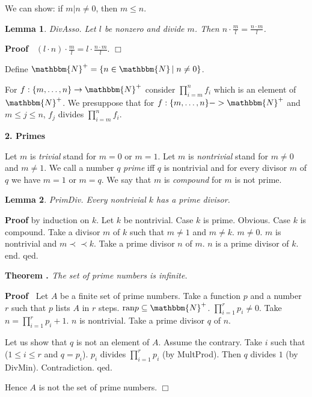 \documentclass{letter}
\newcommand{\precprec}{\prec\!\!\!\prec}
\newcommand{\subsection}[1]{\medskip\bigskip

\noindent\textbf{\Large #1}}
\newcommand{\tmem}[1]{{\em #1\/}}
\newcommand{\tmop}[1]{\ensuremath{\operatorname{#1}}}
\newcommand{\tmtextbf}[1]{{\bfseries{#1}}}
\newcommand{\tmtextit}[1]{{\itshape{#1}}}
\newcommand{\tmtextup}[1]{{\upshape{#1}}}
\newenvironment{proof}{\noindent\textbf{Proof\ }}{\hspace*{\fill}$\Box$\medskip}
\newtheorem{lemma}{Lemma}
\begin{document}
We can show: if $m|n \neq 0$, then $m \leq n$.

\begin{lemma}
  DivAsso. Let $l$ be nonzero and divide $m$. Then $n \cdot \frac{m}{l} =
  \frac{n \cdot m}{l}$.
\end{lemma}

\begin{proof}
  $(l \cdot n) \cdot \frac{m}{l} = l \cdot \frac{n \cdot m}{l}$.
\end{proof}

Define $\mathbbm{N}^+ = \left\{ n \in \mathbbm{N} \left| \right. n \neq 0
\right\}$.

For $f : \left\{ m, \ldots, n \right\} \rightarrow \mathbbm{N}^+$ consider
$\prod_{i = m}^n f_i$ which is an element of $\mathbbm{N}^+$. We presuppose
that for $f : \{m, \ldots, n\}- > \mathbbm{N}^+$ and $m \leq j \leq n$, $f_j$
divides $\prod_{i = m}^n f_i$.

\subsection{2. Primes}

Let $m$ is {\tmem{trivial}} stand for $m = 0$ or $m = 1$. Let $m$ is
{\tmem{nontrivial}} stand for $m \neq 0$ and $m \neq 1$. We call a number $q$
{\tmem{prime}} iff $q$ is nontrivial and for every divisor $m$ of $q$ we have
$m = 1$ or $m = q$. We say that $m$ is {\tmem{compound}} for $m$ is not prime.

\begin{lemma}
  PrimDiv. Every nontrivial $k$ has a prime divisor.
\end{lemma}

\tmtextbf{Proof} by induction on $k$. Let $k$ be nontrivial. Case $k$ is
prime. Obvious. Case $k$ is compound. Take a divisor $m$ of $k$ such that $m
\neq 1$ and $m \neq k$. $m \neq 0$. $m$ is nontrivial and $m \precprec k$.
Take a prime divisor $n$ of $m$. $n$ is a prime divisor of $k$. end. qed.

{\noindent}\tmtextbf{Theorem \tmtextup{1}. }\tmtextit{The set of prime numbers
is infinite.}{\hspace*{\fill}}{\medskip}

\begin{proof}
  Let $A$ be a finite set of prime numbers. Take a function $p$ and a number
  $r$ such that $p$ lists $A$ in $r$ steps. $\text{\tmop{ran}} p \subseteq
  \mathbbm{N}^+$. $\prod_{i = 1}^r p_i \neq 0$. Take $n = \prod_{i = 1}^r p_i
  + 1$. $n$ is nontrivial. Take a prime divisor $q$ of $n$.
  
  Let us show that $q$ is not an element of $A$. Assume the contrary. Take $i$
  such that ($1 \leq i \leq r$ and $q = p_i$). $p_i$ divides $\prod_{i = 1}^r
  p_i$ (by MultProd). Then $q$ divides $1$ (by DivMin). Contradiction. qed.
  
  Hence $A$ is not the set of prime numbers.
\end{proof}
\end{document}
